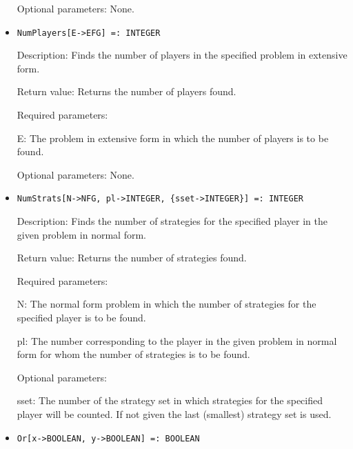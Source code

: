 \begin{itemize}
\item
[Optional parameters:] None.
\ed

\item
\protect \large \begin{verbatim}
NumPlayers[E->EFG] =: INTEGER
\end{verbatim} \normalsize

\bd
\item
[Description:] Finds the number of players in the specified problem in
extensive form.
\item
[Return value:] Returns the number of players found.
\item
[Required parameters:]\hfil\null

\bd
\item
[E:] The problem in extensive form in which the number of players is
to be found.
\ed

\item   
[Optional parameters:] None.
\ed

\item
\protect \large \begin{verbatim}
NumStrats[N->NFG, pl->INTEGER, {sset->INTEGER}] =: INTEGER
\end{verbatim}\normalsize

\bd

\item
[Description:] Finds the number of strategies for the specified player
in the given problem in normal form.
\item
[Return value:] Returns the number of strategies found.
\item
[Required parameters:]\hfil\null

\bd
\item
[N:] The normal form problem in which the number of strategies for the
specified player is to be found.
\item
[pl:] The number corresponding to the player in the given problem in
normal form for whom the number of strategies is to be found.
\ed

\item
[Optional parameters:]\hfil\null
	
\bd
\item  
[sset:] The number of the strategy set in which strategies for the
specified player will be counted.  If not given the last (smallest)
strategy set is used.

\ed
\ed


\item 
\protect \large \begin{verbatim}
Or[x->BOOLEAN, y->BOOLEAN] =: BOOLEAN
\end{verbatim} \normalsize
  

\end{itemize}
